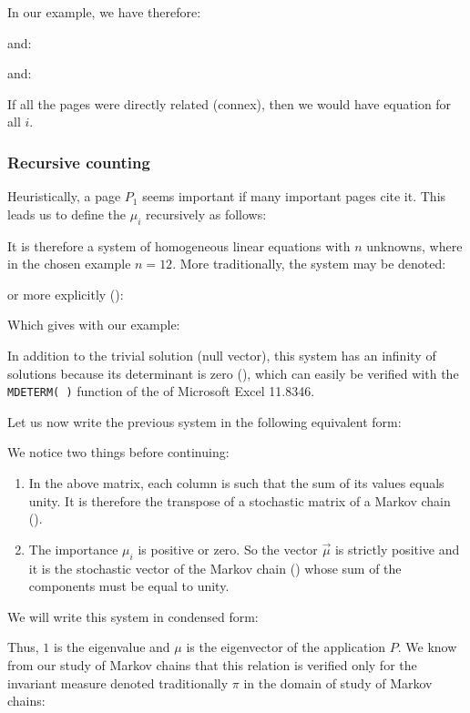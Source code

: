 	In our example, we have therefore:
	
	and:
	
	and:
	
	\begin{tcolorbox}[title=Remark,colframe=black,arc=10pt]
	If all the pages were directly related (connex), then we would have equation for all $i$.
	\end{tcolorbox}
	
	\subsubsection{Recursive counting}
	Heuristically, a page $P_1$ seems important if many important pages cite it. This leads us to define the $\mu_i$ recursively as follows:
	
	It is therefore a system of homogeneous linear equations with $n$ unknowns, where in the chosen example $n=12$. More traditionally, the system may be denoted:
	
	or more explicitly ():
	\setcounter{MaxMatrixCols}{20}
	
	Which gives with our example:
	\setcounter{MaxMatrixCols}{20}
	
	In addition to the trivial solution (null vector), this system has an infinity of solutions because its determinant is zero (), which can easily be verified with the \texttt{MDETERM( )} function of the of Microsoft Excel 11.8346.

	Let us now write the previous system in the following equivalent form:
	\setcounter{MaxMatrixCols}{20}
	
	We notice two things before continuing:
	\begin{enumerate}
		\item In the above matrix, each column is such that the sum of its values equals unity. It is therefore the transpose of a stochastic matrix of a Markov chain ().

		\item The importance $\mu_i$ is positive or zero. So the vector $\vec{\mu}$ is strictly positive and it is the stochastic vector of the Markov chain () whose sum of the components must be equal to unity.
	\end{enumerate}
	We will write this system in condensed form:
	
	Thus, $1$ is the eigenvalue and $\mu$ is the eigenvector of the application $P$. We know from our study of Markov chains that this relation is verified only for the invariant measure denoted traditionally $\pi$ in the domain of study of Markov chains:
	
